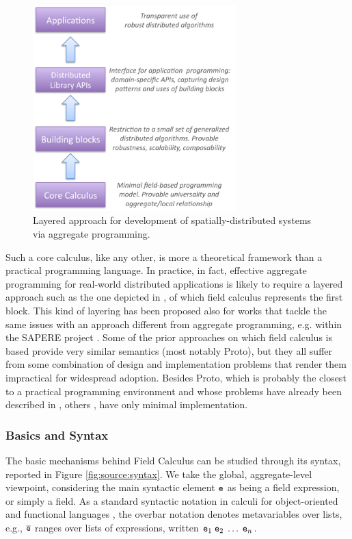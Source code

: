 \documentclass[12pt,a4paper,twoside,openright]{book}
\begin{document}
\begin{figure}
\centering
\includegraphics[width=0.7\textwidth]{img/aggregate-tower}
\caption[Layered approach]{Layered approach for development of spatially-distributed systems via aggregate programming.}
\label{img:researchprogram}
\end{figure}

Such a core calculus, like any other, is more a theoretical framework than a practical programming language.
%
In practice, in fact, effective aggregate programming for real-world distributed applications is likely to require a layered approach such as the one depicted in , of which field calculus represents the first block.
%
This kind of layering has been proposed also for works that tackle the same issues with an approach different from aggregate programming, e.g. within the SAPERE project \cite{gio-chapter,gio-selfcomp}.
%
Some of the prior approaches on which field calculus is based provide very similar semantics (most notably Proto), but they all suffer from some combination of design and implementation problems that render them impractical for widespread adoption.
%
Besides Proto, which is probably the closest to a practical programming environment and whose problems have already been described in , others \cite{VPB-COORD2012}, have only minimal implementation.

\subsubsection{Basics and Syntax}

The basic mechanisms behind Field Calculus can be studied through its syntax, reported in Figure \ref{fig:source:syntax}.
%
We take the global, aggregate-level viewpoint, considering the main syntactic element $\texttt{e}$ as being a field expression, or simply a field.
%
As a standard syntactic notation in calculi for object-oriented and functional languages \cite{FJ}, the overbar notation denotes metavariables over lists, e.g., $\overline {\texttt{e}}$ ranges over lists
of expressions, written $\texttt{e}_1\;\texttt{e}_2\;\ldots\;\texttt{e}_n$.
\end{document}
